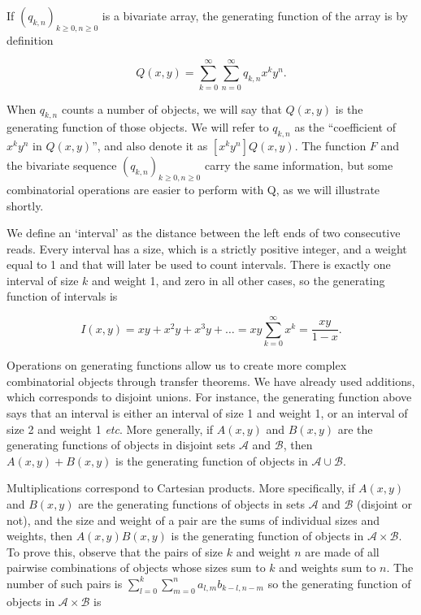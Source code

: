 \documentclass{article}
\begin{document}
If $(q_{k,n})_{k \geq 0, n \geq 0}$ is a bivariate array, the generating
function of the array is by definition

\begin{equation*}
Q(x,y) = \sum_{k=0}^\infty \sum_{n=0}^\infty q_{k,n}x^ky^n.
\end{equation*}

When $q_{k,n}$ counts a number of objects, we will say that $Q(x,y)$ is
the generating function of those objects. We will refer to $q_{k,n}$ as
the ``coefficient of $x^ky^n$ in $Q(x,y)$'', and also denote it as
$[x^ky^n] Q(x,y)$. The function $F$ and the bivariate sequence
$(q_{k,n})_{k \geq 0, n \geq 0}$ carry the same information, but some
combinatorial operations are easier to perform with Q, as we will
illustrate shortly.

We define an `interval' as the distance between the left ends of two
consecutive reads. Every interval has a size, which is a strictly positive
integer, and a weight equal to 1 and that will later be used to count
intervals.  There is exactly one interval of size $k$ and weight 1, and
zero in all other cases, so the generating function of intervals is

\begin{equation*}
I(x,y) = xy + x^2y + x^3y + \ldots
= xy\sum_{k=0}^\infty x^k = \frac{xy}{1-x}.
\end{equation*}

Operations on generating functions allow us to create more complex
combinatorial objects through transfer theorems.  We have already used
additions, which corresponds to disjoint unions. For instance, the
generating function above says that an interval is either an interval of
size 1 and weight 1, or an interval of size 2 and weight 1 \textit{etc}.
More generally, if $A(x,y)$ and $B(x,y)$ are the generating functions of
objects in disjoint sets $\mathcal{A}$ and $\mathcal{B}$, then
$A(x,y)+B(x,y)$ is the generating function of objects in $\mathcal{A} \cup
\mathcal{B}$.

Multiplications correspond to Cartesian products. More specifically, if
$A(x,y)$ and $B(x,y)$ are the generating functions of objects in sets
$\mathcal{A}$ and $\mathcal{B}$ (disjoint or not), and the size and weight
of a pair are the sums of individual sizes and weights, then
$A(x,y)B(x,y)$ is the generating function of objects in $\mathcal{A}
\times \mathcal{B}$. To prove this, observe that the pairs of size $k$ and
weight $n$ are made of all pairwise combinations of objects whose sizes
sum to $k$ and weights sum to $n$. The number of such pairs is
$\sum_{l=0}^k \sum_{m=0}^n a_{l,m}b_{k-l,n-m}$ so the generating function
of objects in $\mathcal{A} \times \mathcal{B}$ is
\end{document}
